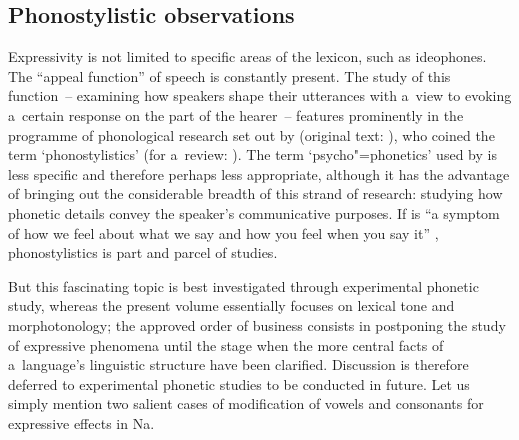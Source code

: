			\subsection{Phonostylistic observations}
			\label{sec:phonostylisticobservations}
			\label{sec:liproundingandprotrusionwithdemonstrativeproximalvalue}
			\label{sec:palatalizationconveyingatenderemotion}
			Expressivity is not limited to specific areas of the lexicon, such as ideophones. The “appeal function” of speech \citep{buhler1934} is constantly present. The study of this function~-- examining how speakers shape their utterances with
			a~view to evoking a~certain response on the part of the hearer~-- features prominently in the
			programme of phonological research set out by \citet[14]{trubetzkoy1969} (original text: \citealt{trubetzkoy1939}), who coined the term
			‘phonostylistics’ (for a~review: \citealt{leon1969}). The term ‘psycho"=phonetics’ used by
			\citet{fonagy1983} is less specific and therefore perhaps less appropriate, although it has the
			advantage of bringing out the considerable breadth of this strand of research: studying how phonetic details convey the speaker’s communicative purposes. If  is “a symptom of how we
			feel about what we say and how you feel when you say it” \citep[1]{bolinger1989}, phonostylistics is
			part and parcel of  studies.
			
			But this fascinating topic is best investigated through experimental phonetic study, whereas the
			present volume essentially focuses on lexical tone and morphotonology; the approved order of business consists
			in postponing the study of expressive phenomena until the stage when the more central facts of
			a~language's linguistic structure have been clarified. Discussion is therefore deferred to
			experimental phonetic studies to be conducted in future. Let us simply mention two salient cases of
			modification of vowels and consonants for expressive effects in Na.
			
